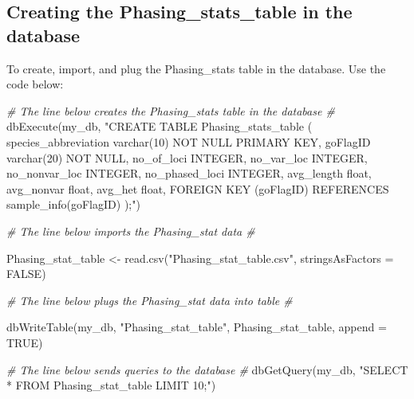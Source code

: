 \documentclass[
]{book}
\newenvironment{Shaded}{\begin{snugshade}}{\end{snugshade}}
\newcommand{\AttributeTok}[1]{\textcolor[rgb]{0.77,0.63,0.00}{#1}}
\newcommand{\CommentTok}[1]{\textcolor[rgb]{0.56,0.35,0.01}{\textit{#1}}}
\newcommand{\ConstantTok}[1]{\textcolor[rgb]{0.00,0.00,0.00}{#1}}
\newcommand{\FunctionTok}[1]{\textcolor[rgb]{0.00,0.00,0.00}{#1}}
\newcommand{\NormalTok}[1]{#1}
\newcommand{\OtherTok}[1]{\textcolor[rgb]{0.56,0.35,0.01}{#1}}
\newcommand{\StringTok}[1]{\textcolor[rgb]{0.31,0.60,0.02}{#1}}
\begin{document}
\hypertarget{creating-the-phasing_stats_table-in-the-database}{%
\subsection{Creating the Phasing\_stats\_table in the database}\label{creating-the-phasing_stats_table-in-the-database}}

To create, import, and plug the Phasing\_stats table in the database. Use the code below:

\begin{Shaded}
\begin{Highlighting}[]
\CommentTok{\# The line below creates the Phasing\_stats table in the database \#}
\FunctionTok{dbExecute}\NormalTok{(my\_db, }\StringTok{"CREATE TABLE Phasing\_stats\_table (}
\StringTok{                        species\_abbreviation varchar(10) NOT NULL PRIMARY                         KEY,}
\StringTok{                        goFlagID varchar(20) NOT NULL,}
\StringTok{                        no\_of\_loci INTEGER,}
\StringTok{                        no\_var\_loc INTEGER,}
\StringTok{                        no\_nonvar\_loc INTEGER,}
\StringTok{                        no\_phased\_loci INTEGER,}
\StringTok{                        avg\_length float,}
\StringTok{                        avg\_nonvar float,}
\StringTok{                        avg\_het float,}
\StringTok{                        FOREIGN KEY (goFlagID) REFERENCES                                        sample\_info(goFlagID)}
\StringTok{                        );"}\NormalTok{)}


\CommentTok{\# The line below imports the Phasing\_stat data \#}

\NormalTok{Phasing\_stat\_table }\OtherTok{\textless{}{-}} \FunctionTok{read.csv}\NormalTok{(}\StringTok{"Phasing\_stat\_table.csv"}\NormalTok{, }\AttributeTok{stringsAsFactors =} \ConstantTok{FALSE}\NormalTok{)}


\CommentTok{\# The line below plugs the Phasing\_stat data into table \#}

\FunctionTok{dbWriteTable}\NormalTok{(my\_db, }\StringTok{"Phasing\_stat\_table"}\NormalTok{, Phasing\_stat\_table, }\AttributeTok{append =} \ConstantTok{TRUE}\NormalTok{)}


\CommentTok{\# The line below sends queries to the database  \#}
\FunctionTok{dbGetQuery}\NormalTok{(my\_db, }\StringTok{"SELECT * FROM Phasing\_stat\_table LIMIT 10;"}\NormalTok{)}
\end{Highlighting}
\end{Shaded}
\end{document}
